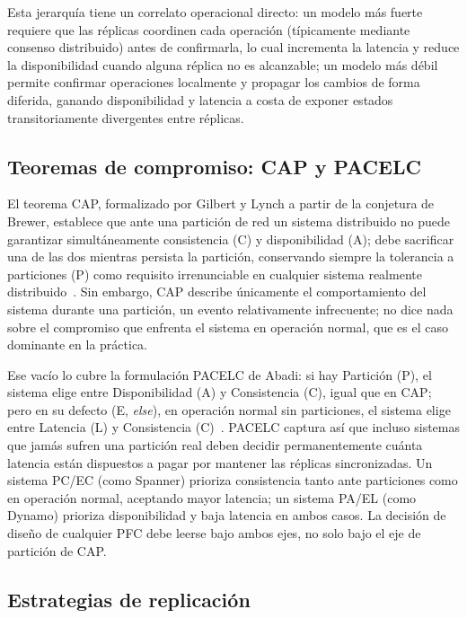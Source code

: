 \documentclass[11pt,a4paper]{article}
\begin{document}
Esta jerarqu\'ia tiene un correlato operacional directo: un modelo m\'as fuerte requiere que las
r\'eplicas coordinen cada operaci\'on (t\'ipicamente mediante consenso distribuido) antes de
confirmarla, lo cual incrementa la latencia y reduce la disponibilidad cuando alguna r\'eplica no
es alcanzable; un modelo m\'as d\'ebil permite confirmar operaciones localmente y propagar los
cambios de forma diferida, ganando disponibilidad y latencia a costa de exponer estados
transitoriamente divergentes entre r\'eplicas.

\subsection{Teoremas de compromiso: CAP y PACELC}
\label{subsec:cap-pacelc}

El teorema CAP, formalizado por Gilbert y Lynch a partir de la conjetura de Brewer, establece que
ante una partici\'on de red un sistema distribuido no puede garantizar simult\'aneamente
consistencia (C) y disponibilidad (A); debe sacrificar una de las dos mientras persista la
partici\'on, conservando siempre la tolerancia a particiones (P) como requisito irrenunciable en
cualquier sistema realmente distribuido~\cite{gilbert2002}. Sin embargo, CAP describe \'unicamente
el comportamiento del sistema durante una partici\'on, un evento relativamente infrecuente; no
dice nada sobre el compromiso que enfrenta el sistema en operaci\'on normal, que es el caso
dominante en la pr\'actica.

Ese vac\'io lo cubre la formulaci\'on PACELC de Abadi: si hay Partici\'on (P), el sistema elige
entre Disponibilidad (A) y Consistencia (C), igual que en CAP; pero en su defecto (E, \emph{else}),
en operaci\'on normal sin particiones, el sistema elige entre Latencia (L) y Consistencia
(C)~\cite{abadi2012}. PACELC captura as\'i que incluso sistemas que jam\'as sufren una partici\'on
real deben decidir permanentemente cu\'anta latencia est\'an dispuestos a pagar por mantener las
r\'eplicas sincronizadas. Un sistema PC/EC (como Spanner) prioriza consistencia tanto ante
particiones como en operaci\'on normal, aceptando mayor latencia; un sistema PA/EL (como Dynamo)
prioriza disponibilidad y baja latencia en ambos casos. La decisi\'on de dise\~no de cualquier PFC
debe leerse bajo ambos ejes, no solo bajo el eje de partici\'on de CAP.

\subsection{Estrategias de replicaci\'on}
\label{subsec:replicacion}
\end{document}
